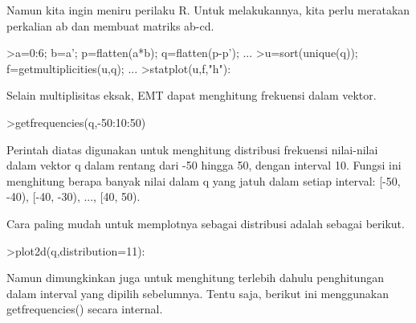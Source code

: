 \documentclass[a4paper,10pt]{article}
\begin{document}
\begin{eulernotebook}
\begin{eulercomment}
\begin{eulercomment}
\begin{eulercomment}
\begin{eulercomment}
\begin{eulercomment}
\begin{eulercomment}
\begin{eulercomment}
\begin{eulercomment}
\begin{eulercomment}
\begin{eulercomment}
\begin{eulercomment}
Namun kita ingin meniru perilaku R. Untuk melakukannya, kita perlu
meratakan perkalian ab dan membuat matriks ab-cd.
\end{eulercomment}
\begin{eulerprompt}
>a=0:6; b=a'; p=flatten(a*b); q=flatten(p-p'); ...
>u=sort(unique(q)); f=getmultiplicities(u,q); ...
>statplot(u,f,"h"):
\end{eulerprompt}
\begin{eulercomment}
Selain multiplisitas eksak, EMT dapat menghitung frekuensi dalam
vektor.
\end{eulercomment}
\begin{eulerprompt}
>getfrequencies(q,-50:10:50)
\end{eulerprompt}
\begin{euleroutput}
  [0,  23,  132,  316,  602,  801,  333,  141,  53,  0]
\end{euleroutput}
\begin{eulercomment}
Perintah diatas digunakan untuk menghitung distribusi frekuensi
nilai-nilai dalam vektor q dalam rentang dari -50 hingga 50, dengan
interval 10. Fungsi ini menghitung berapa banyak nilai dalam q yang
jatuh dalam setiap interval: [-50, -40), [-40, -30), ..., [40, 50).

Cara paling mudah untuk memplotnya sebagai distribusi adalah sebagai
berikut.
\end{eulercomment}
\begin{eulerprompt}
>plot2d(q,distribution=11):
\end{eulerprompt}
\begin{eulercomment}
Namun dimungkinkan juga untuk menghitung terlebih dahulu penghitungan
dalam interval yang dipilih sebelumnya. Tentu saja, berikut ini
menggunakan getfrequencies() secara internal.


\end{eulercomment}
\end{eulercomment}
\end{eulercomment}
\end{eulercomment}
\end{eulercomment}
\end{eulercomment}
\end{eulercomment}
\end{eulercomment}
\end{eulercomment}
\end{eulercomment}
\end{eulercomment}
\end{eulernotebook}
\end{document}
